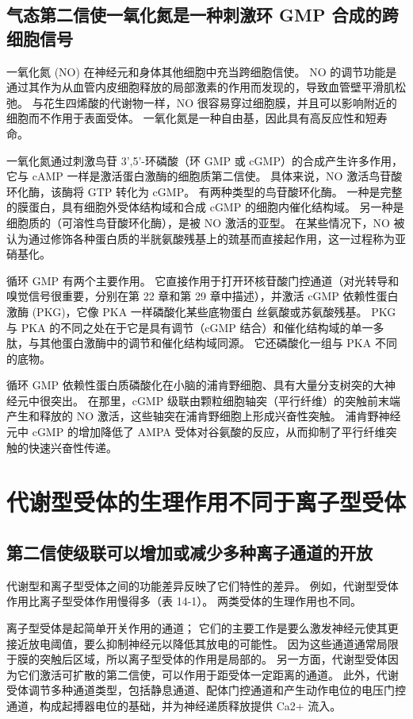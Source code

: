 \subsection{气态第二信使一氧化氮是一种刺激环 GMP 合成的跨细胞信号}

一氧化氮 (NO) 在神经元和身体其他细胞中充当跨细胞信使。 NO 的调节功能是通过其作为从血管内皮细胞释放的局部激素的作用而发现的，导致血管壁平滑肌松弛。 与花生四烯酸的代谢物一样，NO 很容易穿过细胞膜，并且可以影响附近的细胞而不作用于表面受体。 一氧化氮是一种自由基，因此具有高反应性和短寿命。

一氧化氮通过刺激鸟苷 3',5'-环磷酸（环 GMP 或 cGMP）的合成产生许多作用，它与 cAMP 一样是激活蛋白激酶的细胞质第二信使。 具体来说，NO 激活鸟苷酸环化酶，该酶将 GTP 转化为 cGMP。 有两种类型的鸟苷酸环化酶。 一种是完整的膜蛋白，具有细胞外受体结构域和合成 cGMP 的细胞内催化结构域。 另一种是细胞质的（可溶性鸟苷酸环化酶），是被 NO 激活的亚型。 在某些情况下，NO 被认为通过修饰各种蛋白质的半胱氨酸残基上的巯基而直接起作用，这一过程称为亚硝基化。

循环 GMP 有两个主要作用。 它直接作用于打开环核苷酸门控通道（对光转导和嗅觉信号很重要，分别在第 22 章和第 29 章中描述），并激活 cGMP 依赖性蛋白激酶 (PKG)，它像 PKA 一样磷酸化某些底物蛋白 丝氨酸或苏氨酸残基。 PKG 与 PKA 的不同之处在于它是具有调节（cGMP 结合）和催化结构域的单一多肽，与其他蛋白激酶中的调节和催化结构域同源。 它还磷酸化一组与 PKA 不同的底物。

循环 GMP 依赖性蛋白质磷酸化在小脑的浦肯野细胞、具有大量分支树突的大神经元中很突出。 在那里，cGMP 级联由颗粒细胞轴突（平行纤维）的突触前末端产生和释放的 NO 激活，这些轴突在浦肯野细胞上形成兴奋性突触。 浦肯野神经元中 cGMP 的增加降低了 AMPA 受体对谷氨酸的反应，从而抑制了平行纤维突触的快速兴奋性传递。


\section{代谢型受体的生理作用不同于离子型受体}

\subsection{第二信使级联可以增加或减少多种离子通道的开放}
代谢型和离子型受体之间的功能差异反映了它们特性的差异。 例如，代谢型受体作用比离子型受体作用慢得多（表 14-1）。 两类受体的生理作用也不同。

离子型受体是起简单开关作用的通道； 它们的主要工作是要么激发神经元使其更接近放电阈值，要么抑制神经元以降低其放电的可能性。 因为这些通道通常局限于膜的突触后区域，所以离子型受体的作用是局部的。 另一方面，代谢型受体因为它们激活可扩散的第二信使，可以作用于距受体一定距离的通道。 此外，代谢受体调节多种通道类型，包括静息通道、配体门控通道和产生动作电位的电压门控通道，构成起搏器电位的基础，并为神经递质释放提供 Ca2+ 流入。

